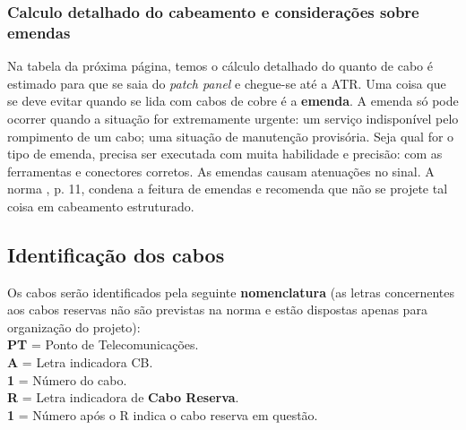 \documentclass[	DIV=calc,%
							paper=a4,%
							fontsize=12pt,%
							onecolumn]{scrartcl}	 					%
\begin{document}
\subsubsection{Calculo detalhado do cabeamento e considerações sobre emendas}

Na tabela da próxima página, temos o cálculo detalhado do quanto de cabo é estimado para que se saia do \textit{patch panel} e chegue-se até a ATR. Uma coisa que se deve evitar quando se lida com cabos de cobre é a \textbf{emenda}. A emenda só pode ocorrer quando a situação for extremamente urgente: um serviço indisponível pelo rompimento de um cabo; uma situação de manutenção provisória. Seja qual for o tipo de emenda, precisa ser executada com muita habilidade e precisão: com as ferramentas e conectores corretos. As emendas causam atenuações no sinal. A norma \cite{abnt14565}, p. 11, condena a feitura de emendas e recomenda que não se projete tal coisa em cabeamento estruturado.




\clearpage
\thispagestyle{plain}

\recalctypearea

{\centering

}

\clearpage
{}
\recalctypearea

\subsection{Identificação dos cabos}

Os cabos serão identificados pela seguinte \textbf{nomenclatura} (as letras concernentes aos cabos reservas não são previstas na norma e estão dispostas apenas para organização do projeto):
\\

\textbf{PT} = Ponto de Telecomunicações.
\\

\textbf{A} = Letra indicadora CB.
\\

\textbf{1} = Número do cabo.
\\

\textbf{R} = Letra indicadora de \textbf{Cabo Reserva}.
\\

\textbf{1} = Número após o R indica o cabo reserva em questão.
\\
\end{document}
